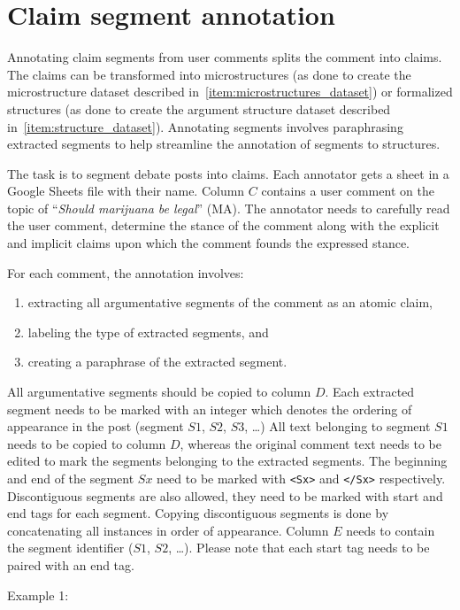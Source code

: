 \section{Claim segment annotation}
\label{sec:argseg_annotation}

Annotating claim segments from user comments splits the comment into claims. The
claims can be transformed into microstructures (as done to create the
microstructure dataset described in~\ref{item:microstructures_dataset}) or
formalized structures (as done to create the argument structure dataset
described in~\ref{item:structure_dataset}). Annotating segments involves
paraphrasing extracted segments to help streamline the annotation of segments
to structures. 

The task is to segment debate posts into claims. Each annotator gets a sheet in
a Google Sheets file with their name.  Column $C$ contains a user comment on
the topic of ``\textit{Should marijuana be legal}'' (MA).  The annotator needs
to carefully read the user comment, determine the stance of the comment along
with the explicit and implicit claims upon which the comment founds the
expressed stance. 

For each comment, the annotation involves:
\begin{enumerate}
\item extracting all argumentative segments of the comment as an atomic claim,
\item labeling the type of extracted segments, and
\item creating a paraphrase of the extracted segment.
\end{enumerate}
All argumentative segments should be copied to column $D$. 
Each extracted segment needs to be marked with an integer which denotes the
ordering of appearance in the post (segment $S1$, $S2$, $S3$, \dots)
All text belonging to segment $S1$ needs to be copied to column $D$, whereas
the original comment text needs to be edited to mark the segments belonging to 
the extracted segments. The beginning and end 
of the segment $Sx$ need to be marked with \texttt{<Sx>} and \texttt{</Sx>} respectively. 
Discontiguous segments are also allowed, they need to be marked with start and end tags
for each segment. Copying discontiguous segments is done by concatenating all 
instances in order of appearance. 
Column $E$ needs to contain the segment 
identifier ($S1$, $S2$, \dots). Please note that each start tag needs to be
paired with an end tag. 

\noindent Example 1: 

